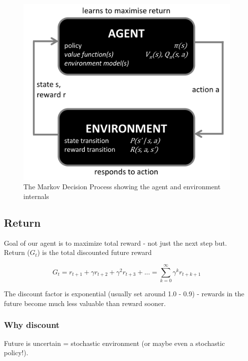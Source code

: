 \documentclass[]{article}
\begin{document}
\newpage

\begin{figure}
\centering
\includegraphics[width=\textwidth,height=0.5\textheight]{./tex2pdf.-4c1708fb449e9e84/a6864eb409708feab0fc8622776c8f177fe15c63.png}
\caption{The Markov Decision Process showing the agent and environment
internals}
\end{figure}

\newpage

\hypertarget{return}{%
\subsection{Return}\label{return}}

Goal of our agent is to maximize total reward - not just the next step
but. Return (\(G_t\)) is the total discounted future reward

\[ G_t = r_{t+1} + \gamma r_{t+2} + \gamma^2 r_{t+3} + ... = \sum_{k=0}^{\infty} \gamma^k r_{t+k+1} \]

The discount factor is exponential (usually set around 1.0 - 0.9) -
rewards in the future become much less valuable than reward sooner.

\hypertarget{why-discount}{%
\subsubsection{Why discount}\label{why-discount}}

Future is uncertain = stochastic environment (or maybe even a stochastic
policy!).
\end{document}
